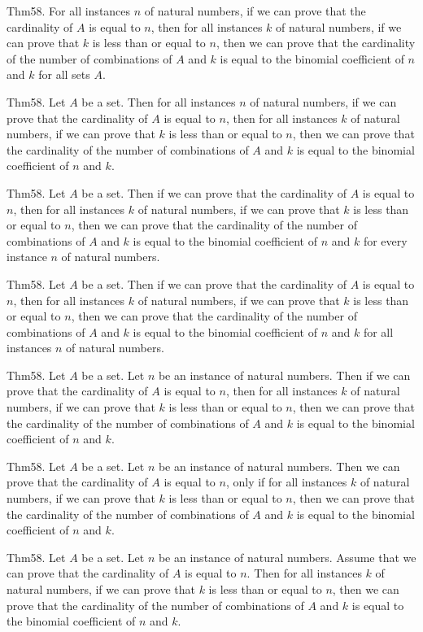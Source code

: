\documentclass{article}
\begin{document}
Thm58. For all instances $n$ of natural numbers, if we can prove that the cardinality of $A$ is equal to $n$, then for all instances $k$ of natural numbers, if we can prove that $k$ is less than or equal to $n$, then we can prove that the cardinality of the number of combinations of $A$ and $k$ is equal to the binomial coefficient of $n$ and $k$ for all sets $A$.

Thm58. Let $A$ be a set. Then for all instances $n$ of natural numbers, if we can prove that the cardinality of $A$ is equal to $n$, then for all instances $k$ of natural numbers, if we can prove that $k$ is less than or equal to $n$, then we can prove that the cardinality of the number of combinations of $A$ and $k$ is equal to the binomial coefficient of $n$ and $k$.

Thm58. Let $A$ be a set. Then if we can prove that the cardinality of $A$ is equal to $n$, then for all instances $k$ of natural numbers, if we can prove that $k$ is less than or equal to $n$, then we can prove that the cardinality of the number of combinations of $A$ and $k$ is equal to the binomial coefficient of $n$ and $k$ for every instance $n$ of natural numbers.

Thm58. Let $A$ be a set. Then if we can prove that the cardinality of $A$ is equal to $n$, then for all instances $k$ of natural numbers, if we can prove that $k$ is less than or equal to $n$, then we can prove that the cardinality of the number of combinations of $A$ and $k$ is equal to the binomial coefficient of $n$ and $k$ for all instances $n$ of natural numbers.

Thm58. Let $A$ be a set. Let $n$ be an instance of natural numbers. Then if we can prove that the cardinality of $A$ is equal to $n$, then for all instances $k$ of natural numbers, if we can prove that $k$ is less than or equal to $n$, then we can prove that the cardinality of the number of combinations of $A$ and $k$ is equal to the binomial coefficient of $n$ and $k$.

Thm58. Let $A$ be a set. Let $n$ be an instance of natural numbers. Then we can prove that the cardinality of $A$ is equal to $n$, only if for all instances $k$ of natural numbers, if we can prove that $k$ is less than or equal to $n$, then we can prove that the cardinality of the number of combinations of $A$ and $k$ is equal to the binomial coefficient of $n$ and $k$.

Thm58. Let $A$ be a set. Let $n$ be an instance of natural numbers. Assume that we can prove that the cardinality of $A$ is equal to $n$. Then for all instances $k$ of natural numbers, if we can prove that $k$ is less than or equal to $n$, then we can prove that the cardinality of the number of combinations of $A$ and $k$ is equal to the binomial coefficient of $n$ and $k$.
\end{document}
